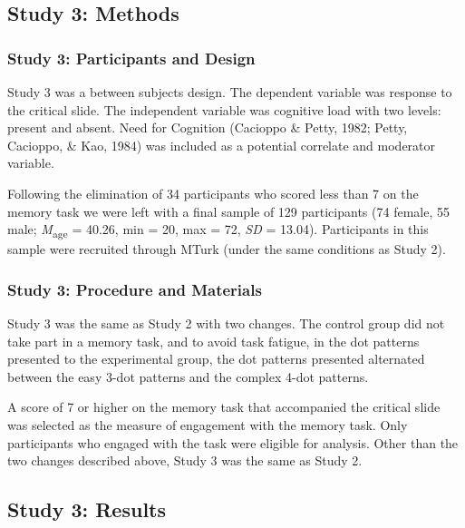 \documentclass[
  american,
  man,floatsintext]{apa7}
\begin{document}
\hypertarget{study-3-methods}{%
\subsection{Study 3: Methods}\label{study-3-methods}}

\hypertarget{study-3-participants-and-design}{%
\subsubsection{Study 3: Participants and Design}\label{study-3-participants-and-design}}

Study 3 was a between subjects design. The dependent variable was response to the critical slide. The independent variable was cognitive load with two levels: present and absent. Need for Cognition (Cacioppo \& Petty, 1982; Petty, Cacioppo, \& Kao, 1984) was included as a potential correlate and moderator variable.

Following the elimination of 34 participants who scored less than 7 on the memory task we were left with a final sample of 129 participants (74 female, 55 male; \emph{M}\textsubscript{age} = 40.26, min = 20, max = 72, \emph{SD} = 13.04). Participants in this sample were recruited through MTurk (under the same conditions as Study 2).

\hypertarget{study-3-procedure-and-materials}{%
\subsubsection{Study 3: Procedure and Materials}\label{study-3-procedure-and-materials}}

Study 3 was the same as Study 2 with two changes. The control group did not take part in a memory task, and to avoid task fatigue, in the dot patterns presented to the experimental group, the dot patterns presented alternated between the easy 3-dot patterns and the complex 4-dot patterns.

A score of 7 or higher on the memory task that accompanied the critical slide was selected as the measure of engagement with the memory task. Only participants who engaged with the task were eligible for analysis. Other than the two changes described above, Study 3 was the same as Study 2.

\hypertarget{study-3-results}{%
\subsection{Study 3: Results}\label{study-3-results}}
\end{document}
